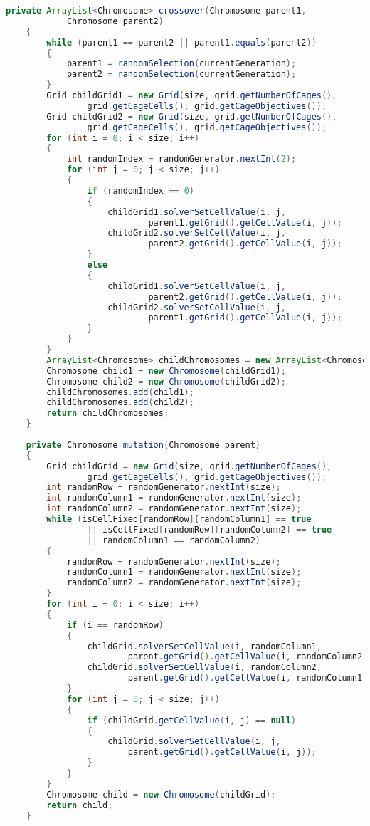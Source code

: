 \begin{lstlisting}[language=Java,basicstyle=\tiny,caption=SolverGenetic.java]
    private ArrayList<Chromosome> crossover(Chromosome parent1, 
            Chromosome parent2)
    {
        while (parent1 == parent2 || parent1.equals(parent2))
        {
            parent1 = randomSelection(currentGeneration);
            parent2 = randomSelection(currentGeneration);
        }
        Grid childGrid1 = new Grid(size, grid.getNumberOfCages(), 
                grid.getCageCells(), grid.getCageObjectives());
        Grid childGrid2 = new Grid(size, grid.getNumberOfCages(), 
                grid.getCageCells(), grid.getCageObjectives());
        for (int i = 0; i < size; i++)
        {
            int randomIndex = randomGenerator.nextInt(2);
            for (int j = 0; j < size; j++)
            {
                if (randomIndex == 0)
                {
                    childGrid1.solverSetCellValue(i, j, 
                            parent1.getGrid().getCellValue(i, j));
                    childGrid2.solverSetCellValue(i, j, 
                            parent2.getGrid().getCellValue(i, j));
                }
                else
                {
                    childGrid1.solverSetCellValue(i, j, 
                            parent2.getGrid().getCellValue(i, j));
                    childGrid2.solverSetCellValue(i, j, 
                            parent1.getGrid().getCellValue(i, j));
                }
            }
        }
        ArrayList<Chromosome> childChromosomes = new ArrayList<Chromosome>();
        Chromosome child1 = new Chromosome(childGrid1);
        Chromosome child2 = new Chromosome(childGrid2);
        childChromosomes.add(child1);
        childChromosomes.add(child2);
        return childChromosomes;
    }
    
    private Chromosome mutation(Chromosome parent)
    {
        Grid childGrid = new Grid(size, grid.getNumberOfCages(), 
                grid.getCageCells(), grid.getCageObjectives());
        int randomRow = randomGenerator.nextInt(size);
        int randomColumn1 = randomGenerator.nextInt(size);
        int randomColumn2 = randomGenerator.nextInt(size);
        while (isCellFixed[randomRow][randomColumn1] == true 
                || isCellFixed[randomRow][randomColumn2] == true 
                || randomColumn1 == randomColumn2)
        {
            randomRow = randomGenerator.nextInt(size);
            randomColumn1 = randomGenerator.nextInt(size);
            randomColumn2 = randomGenerator.nextInt(size);
        }
        for (int i = 0; i < size; i++)
        {
            if (i == randomRow)
            {
                childGrid.solverSetCellValue(i, randomColumn1, 
                        parent.getGrid().getCellValue(i, randomColumn2));
                childGrid.solverSetCellValue(i, randomColumn2, 
                        parent.getGrid().getCellValue(i, randomColumn1));
            }
            for (int j = 0; j < size; j++)
            {
                if (childGrid.getCellValue(i, j) == null)
                {
                    childGrid.solverSetCellValue(i, j, 
                        parent.getGrid().getCellValue(i, j));
                }
            }
        }
        Chromosome child = new Chromosome(childGrid);
        return child;
    }
    

\end{lstlisting}
